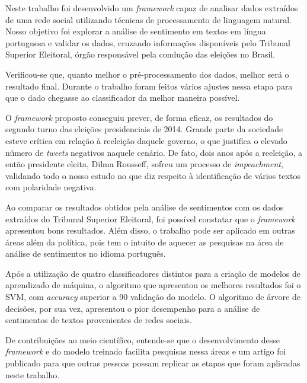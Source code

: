 Neste trabalho foi desenvolvido um \textit{framework} capaz de
analisar dados extraídos de uma rede social utilizando técnicas
de processamento de linguagem natural. Nosso objetivo foi
explorar a análise de sentimento em textos em língua portuguesa e
validar os dados, cruzando informações disponíveis pelo Tribunal Superior Eleitoral, órgão
responsável pela condução das eleições no Brasil.


Verificou-se que, quanto melhor o pré-processamento dos dados, melhor será o resultado final. Durante o trabalho foram feitos vários ajustes nessa
etapa para que o dado chegasse ao classificador da melhor maneira possível.

O \textit{framework} proposto conseguiu prever, de forma eficaz, os resultados do segundo turno das eleições presidenciais de 2014. 
Grande parte da sociedade esteve crítica em relação à reeleição daquele governo, o que justifica o elevado número de \textit{tweets} negativos
 naquele cenário. De fato, dois anos após a reeleição, a então presidente 
eleita, Dilma Rousseff, sofreu um processo de \textit{impeachment}, validando todo o nosso estudo no que diz respeito à identificação de 
vários textos com polaridade negativa.

Ao comparar os resultados obtidos pela análise de sentimentos com os dados extraídos do Tribunal Superior Eleitoral, 
foi possível constatar que o \textit{framework} apresentou bons resultados. 
Além disso, o trabalho pode ser aplicado em outras áreas além da política, pois tem o intuito
de aquecer as pesquisas na área de análise de sentimentos no idioma português.

Após a utilização de quatro classificadores distintos para a criação de modelos de aprendizado de máquina, 
o algoritmo que apresentou os melhores resultados foi o \acrshort{SVM}, com \textit{accuracy} superior a 90%
validação do modelo. 
O algoritmo de árvore de decisões, por sua vez, apresentou o pior desempenho para a análise de sentimentos de textos provenientes
de redes sociais.

De contribuições ao meio científico, entende-se que o desenvolvimento desse \textit{framework} e do modelo treinado facilita
pesquisas nessa áreas e um artigo foi publicado para que outras pessoas possam replicar as etapas que foram aplicadas neste trabalho.

